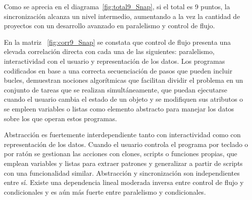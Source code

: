 \documentclass[a4paper, 12pt]{book}
\begin{document}
Como se aprecia en el diagrama~\ref{fig:total9_Snap}, si el total es 9 puntos, la sincronización alcanza un nivel intermedio, aumentando a la vez la cantidad de proyectos con un desarrollo avanzado en paralelismo y control de flujo. 

En la matriz ~\ref{fig:corr9_Snap} se constata que control de flujo presenta una elevada correlación directa con cada una de las siguientes: paralelismo, interactividad con el usuario y representación de los datos. 
Los programas codificados en base a una correcta secuenciación de pasos que pueden incluir bucles, demuestran nociones algorítmicas que facilitan dividir el problema en un conjunto de tareas que se realizan simultáneamente, que puedan ejecutarse cuando el usuario cambia el estado de un objeto y se modifiquen sus atributos o se empleen variables o listas como elemento abstracto para manejar los datos sobre los que operan estos programas. 

Abstracción es fuertemente interdependiente tanto con interactividad como con representación de los datos. Cuando el usuario controla el programa por teclado o por ratón se gestionan las acciones con clones, scripts o funciones propias, que emplean variables y listas para extraer patrones y generalizar a partir de scripts con una funcionalidad similar. Abstracción y sincronización son independientes entre sí. Existe una dependencia lineal moderada inversa entre control de flujo y condicionales y es aún más fuerte entre paralelismo y condicionales.
\end{document}
